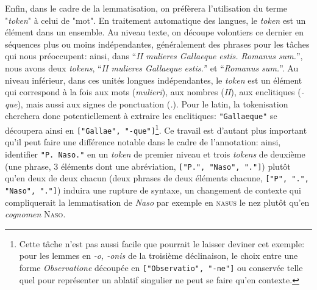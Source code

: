 Enfin, dans le cadre de la lemmatisation, on préfèrera l'utilisation du terme "\textit{token}" à celui de "mot". En traitement automatique des langues, le \textit{token} est un élément dans un ensemble. Au niveau texte, on découpe volontiers ce dernier en séquences plus ou moins indépendantes, généralement des phrases pour les tâches qui nous préoccupent: ainsi, dans ``\textit{II mulieres Gallaeque estis. Romanus sum.}'', nous avons deux \textit{tokens}, ``\textit{II mulieres Gallaeque estis.'}' et ``\textit{Romanus sum.}''. Au niveau inférieur, dans ces unités longues indépendantes, le \textit{token} est un élément qui correspond à la fois aux mots (\textit{mulieri}), aux nombres (\textit{II}), aux enclitiques (\textit{-que}), mais aussi aux signes de ponctuation (\textit{.}). Pour le latin, la tokenisation cherchera donc potentiellement à extraire les enclitiques: \texttt{"Gallaeque"} se découpera ainsi en \texttt{["Gallae", "-que"]}\footnote{Cette tâche n'est pas aussi facile que pourrait le laisser deviner cet exemple: pour les lemmes en \textit{-o, -onis} de la troisième déclinaison, le choix entre une forme \textit{Observatione} découpée en \texttt{["Observatio", "-ne"]} ou conservée telle quel pour représenter un ablatif singulier ne peut se faire qu'en contexte.}. Ce travail est d'autant plus important qu'il peut faire une différence notable dans le cadre de l'annotation: ainsi, identifier \texttt{"P. Naso."} en un \textit{token} de premier niveau et trois \textit{tokens} de deuxième (une phrase, 3 éléments dont une abréviation, \texttt{["P.", "Naso", "."]}) plutôt qu'en deux de deux chacun (deux phrases de deux éléments chacune, \texttt{["P", ".", "Naso", "."]}) induira une rupture de syntaxe, un changement de contexte qui compliquerait la lemmatisation de \textit{Naso} par exemple en \textsc{nasus} le nez plutôt qu'en \textit{cognomen} \textsc{Naso}.

